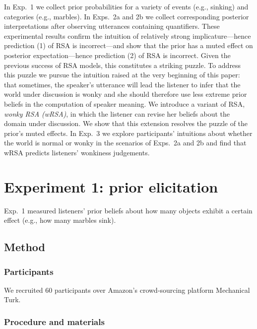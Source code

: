 \documentclass[10pt,letterpaper]{article}
\begin{document}
In Exp.~1 we collect prior probabilities for a variety of events (e.g., sinking) and categories (e.g., marbles). In Exps.~2a and 2b we collect corresponding posterior interpretations after observing  utterances containing quantifiers. These experimental results confirm the intuition of relatively strong implicature---hence prediction (1) of RSA is incorrect---and show that the prior has a muted effect on posterior expectation---hence prediction (2) of RSA is incorrect.
Given the previous success of RSA models, this constitutes a striking puzzle. 
To address this puzzle we pursue the intuition raised at the very beginning of this paper: that sometimes, the speaker's utterance will lead the listener to infer that the world under discussion is wonky and she should therefore use less extreme prior beliefs in the computation of speaker meaning. We introduce a variant of RSA, \emph{wonky RSA (wRSA)}, in which the listener can revise her beliefs about the domain under discussion. We show that this extension resolves the puzzle of the prior's muted effects.
In Exp.~3 we explore participants' intuitions about whether the world is normal or wonky in the scenarios of Exps.~2a and 2b and find that wRSA predicts listeners' wonkiness judgements.


\section{Experiment 1: prior elicitation} 

Exp.~1 measured listeners' prior beliefs about how many objects exhibit a certain effect (e.g., how many marbles sink).%

\subsection{Method}

\subsubsection{Participants}
We recruited 60 participants over Amazon's crowd-sourcing platform Mechanical Turk.

\subsubsection{Procedure and materials}
\end{document}
